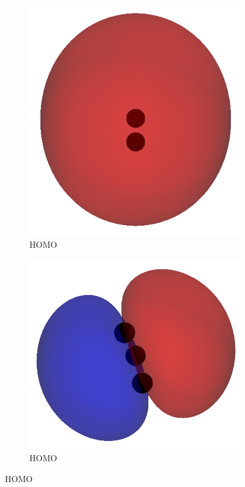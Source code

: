\documentclass[12pt]{article}
\begin{document}
\begin{figure}[H]
    \centering
    \begin{subfigure}[b]{0.25\textwidth}
        \includegraphics[width=\textwidth]{figures/h2_homo.png}
        \caption{ HOMO}
    \end{subfigure}
    \hspace{1em}
    \begin{subfigure}[b]{0.25\textwidth}
        \includegraphics[width=\textwidth]{figures/h2o_homo.png}
        \caption{ HOMO}
    \end{subfigure}


\end{figure}
\end{document}
